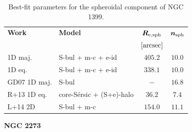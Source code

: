 \documentclass[preprint2]{emulateapj}
\begin{document}
  \begin{table}[h]
  \small
  \caption{Best-fit parameters for the spheroidal component of NGC 1399.}
  \begin{center}
  \begin{tabular}{llcc}
  \hline
  {\bf Work} & {\bf Model}   & $\bm R_{\rm e,sph}$    & $\bm n_{\rm sph}$ \\
    &  &  $[\rm arcsec]$ & \\
  \hline
  1D maj. & S-bul + m-c + e-id & $405.2$  &  $10.0$ \\
  1D eq.  & S-bul + m-c + e-id & $338.1$  &  $10.0$ \\
  \hline
  GD07 1D maj.        & S-bul  		    & $-$      &  $16.8$ \\
  R+13 1D eq.         & core-S\'ersic + (S+e)-halo & $36.2$   &  $7.4$ \\
  L+14 2D             & S-bul + m-c		    & $154.0$  &  $11.1$ \\
  \hline
  \end{tabular}
  \end{center}
  \label{tab:n1399}
  \end{table}

  \clearpage\newpage\noindent
  {\bf NGC 2273 \\}
\end{document}

